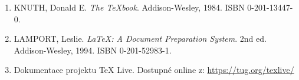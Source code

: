 \begin{enumerate}
  \item KNUTH, Donald E. \emph{The TeXbook}. Addison-Wesley, 1984. ISBN 0-201-13447-0.
  \item LAMPORT, Leslie. \emph{LaTeX: A Document Preparation System}. 2nd ed. Addison-Wesley, 1994. ISBN 0-201-52983-1.
  \item Dokumentace projektu TeX Live. Dostupné online z: \url{https://tug.org/texlive/}
\end{enumerate}
